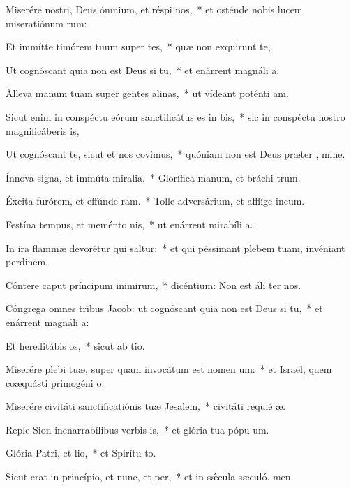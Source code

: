\item Miserére nostri, Deus ómnium, et réspi nos,~* et osténde nobis lucem miseratiónum rum:
\item Et immítte timórem tuum super tes,~* quæ non exquirunt te,
\item Ut cognóscant quia non est Deus si tu,~* et enárrent magnáli a.
\item Álleva manum tuam super gentes alinas,~* ut vídeant poténti am.
\item Sicut enim in conspéctu eórum sanctificátus es in bis,~* sic in conspéctu nostro magnificáberis  is,
\item Ut cognóscant te, sicut et nos covimus,~* quóniam non est Deus præter , mine.
\item Ínnova signa, et immúta miralia.~* Glorífica manum, et bráchi trum.
\item Éxcita furórem, et effúnde ram.~* Tolle adversárium, et afflíge incum.
\item Festína tempus, et meménto nis,~* ut enárrent mirabíli a.
\item In ira flammæ devorétur qui saltur:~* et qui péssimant plebem tuam, invéniant perdinem.
\item Cóntere caput príncipum inimirum,~* dicéntium: Non est áli ter nos.
\item Cóngrega omnes tribus Jacob: ut cognóscant quia non est Deus si tu,~* et enárrent magnáli a:
\item Et hereditábis os,~* sicut ab tio.
\item Miserére plebi tuæ, super quam invocátum est nomen um:~* et Israël, quem coæquásti primogéni o.
\item Miserére civitáti sanctificatiónis tuæ Jesalem,~* civitáti requié æ.
\item Reple Sion inenarrabílibus verbis is,~* et glória tua pópu um.
\item Glória Patri, et lio,~* et Spirítu to.
\item Sicut erat in princípio, et nunc, et per,~* et in sǽcula sæculó. men.

